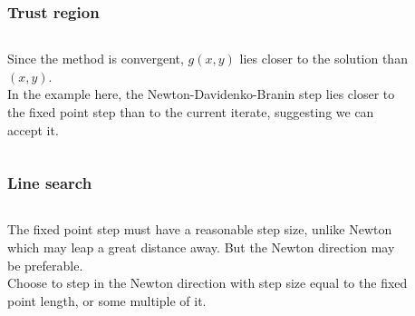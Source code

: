 \documentclass{beamer}
\begin{document}
\begin{frame}
\frametitle{Trust region}

\begin{columns}
	\begin{column}{0.5\textwidth}
		Since the method is convergent, $g(x,y)$ lies closer to the solution than $(x,y)$.
		\\
		\vspace{1em}
		In the example here, the Newton-Davidenko-Branin step lies closer to the fixed point step than to the current iterate, suggesting we can accept it.
	\end{column}
	\begin{column}{0.5\textwidth}
		\begin{figure}
		\end{figure}
	\end{column}
\end{columns}

\end{frame}

\begin{frame}
\frametitle{Line search}

\begin{columns}
	\begin{column}{0.5\textwidth}
		The fixed point step must have a reasonable step size, unlike Newton which may leap a great distance away.
		But the Newton direction may be preferable.
		\\
		\vspace{1em}
		Choose to step in the Newton direction with step size equal to the fixed point length, or some multiple of it.
	\end{column}
	\begin{column}{0.5\textwidth}
		\begin{figure}
		\end{figure}
	\end{column}
\end{columns}

\end{frame}
\end{document}
